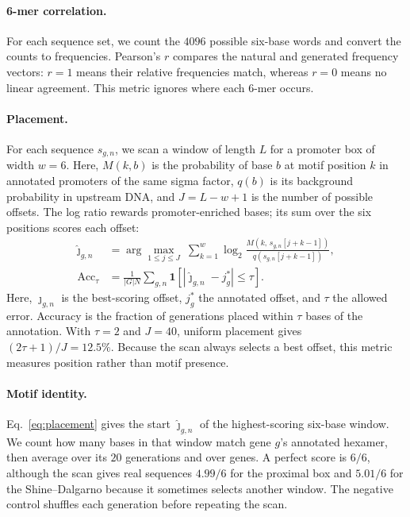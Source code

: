 \documentclass{article}
\begin{document}
\paragraph{6-mer correlation.} For each sequence set, we count the $4096$
possible six-base words and convert the counts to frequencies. Pearson's $r$
compares the natural and generated frequency vectors: $r=1$ means their relative
frequencies match, whereas $r=0$ means no linear agreement. This metric ignores
where each 6-mer occurs.

\paragraph{Placement.} For each sequence $s_{g,n}$, we scan a window of length
$L$ for a promoter box of width $w=6$. Here, $M(k,b)$ is the probability of base
$b$ at motif position $k$ in annotated promoters of the same sigma factor,
$q(b)$ is its background probability in upstream DNA, and $J=L-w+1$ is the
number of possible offsets. The log ratio rewards promoter-enriched bases; its
sum over the six positions scores each offset:
\begin{equation}
\begin{aligned}
\hat\jmath_{g,n}
&=\arg\max_{1\le j\le J}\;\sum_{k=1}^{w}
\log_2\frac{M\!\left(k,\,s_{g,n}[j{+}k{-}1]\right)}
{q\!\left(s_{g,n}[j{+}k{-}1]\right)},\\
\mathrm{Acc}_\tau
&=\frac{1}{|G|N}\sum_{g,n}
\mathbf{1}\!\left[\left|\hat\jmath_{g,n}-j^{*}_{g}\right|\le\tau\right].
\end{aligned}
\label{eq:placement}
\end{equation}
Here, $\hat\jmath_{g,n}$ is the best-scoring offset, $j_g^*$ the annotated offset,
and $\tau$ the allowed error. Accuracy is the fraction of generations placed
within $\tau$ bases of the annotation. With $\tau=2$ and $J=40$, uniform placement
gives $(2\tau+1)/J=12.5\%$. Because the scan always selects a best offset, this
metric measures position rather than motif presence.

\paragraph{Motif identity.} Eq.~\ref{eq:placement} gives the start
$\hat\jmath_{g,n}$ of the highest-scoring six-base window. We count how many bases
in that window match gene $g$'s annotated hexamer, then average over its $20$
generations and over genes. A perfect score is $6/6$, although the scan gives real
sequences $4.99/6$ for the proximal box and $5.01/6$ for the Shine--Dalgarno
because it sometimes selects another window. The negative control shuffles each
generation before repeating the scan.
\end{document}
